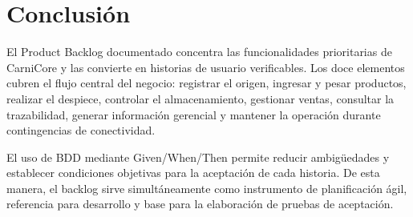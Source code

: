\documentclass[11pt,a4paper]{article}
\begin{document}
\section{Conclusión}
El Product Backlog documentado concentra las funcionalidades prioritarias de CarniCore y
las convierte en historias de usuario verificables. Los doce elementos cubren el flujo central
del negocio: registrar el origen, ingresar y pesar productos, realizar el despiece, controlar
el almacenamiento, gestionar ventas, consultar la trazabilidad, generar información gerencial
y mantener la operación durante contingencias de conectividad.

El uso de BDD mediante Given/When/Then permite reducir ambigüedades y establecer condiciones
objetivas para la aceptación de cada historia. De esta manera, el backlog sirve simultáneamente
como instrumento de planificación ágil, referencia para desarrollo y base para la elaboración
de pruebas de aceptación.
\end{document}
